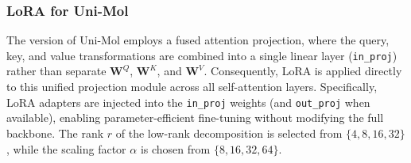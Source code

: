 \documentclass[pdflatex,sn-basic]{sn-jnl}%
\begin{document}
\subsubsection{LoRA for Uni-Mol}
The version of Uni-Mol employs a fused attention projection, where the query, key, and value transformations are combined into a single linear layer (\texttt{in\_proj}) rather than separate $\mathbf{W}^Q$, $\mathbf{W}^K$, and $\mathbf{W}^V$. Consequently, LoRA is applied directly to this unified projection module across all self-attention layers. Specifically, LoRA adapters are injected into the \texttt{in\_proj} weights (and \texttt{out\_proj} when available), enabling parameter-efficient fine-tuning without modifying the full backbone. The rank $r$ of the low-rank decomposition is selected from $\{4, 8, 16, 32\}$, while the scaling factor $\alpha$ is chosen from $\{8, 16, 32, 64\}$.
\end{document}
